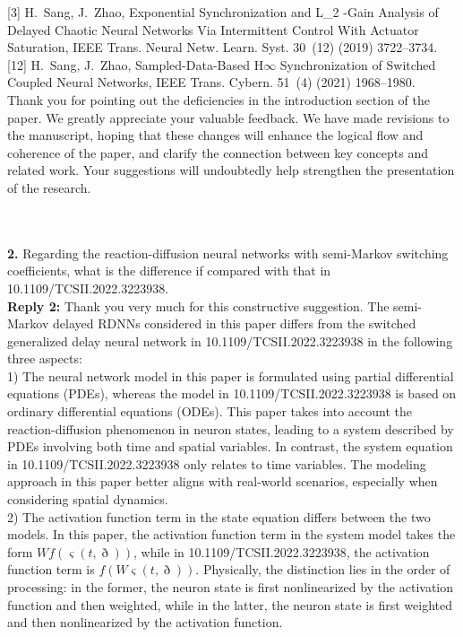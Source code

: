 \documentclass[14pt,fleqn]{article}
\begin{document}
{\color{red} [3] H.~Sang, J.~Zhao, Exponential {{Synchronization}} and {{L}}\_2 -{{Gain
			Analysis}} of {{Delayed Chaotic Neural Networks Via Intermittent Control With
			Actuator Saturation}}, IEEE Trans. Neural Netw. Learn. Syst. 30~(12) (2019)
	3722--3734.}\\
	
{\color{red} [12] H.~Sang, J.~Zhao, Sampled-{{Data-Based H}}{$\infty$} {{Synchronization}} of
	{{Switched Coupled Neural Networks}}, IEEE Trans. Cybern. 51~(4) (2021)
	1968--1980.}\\
	
Thank you for pointing out the deficiencies in the introduction section of the paper. We greatly appreciate your valuable feedback. We have made revisions to the manuscript, hoping that these changes will enhance the logical flow and coherence of the paper, and clarify the connection between key concepts and related work. Your suggestions will undoubtedly help strengthen the presentation of the research.

~\\
\\
\textbf{2.} Regarding the reaction-diffusion neural networks with semi-Markov switching coefficients, what is the difference if compared with that in 10.1109/TCSII.2022.3223938.
\\[10pt]
\indent \textbf{Reply 2:} Thank you very much for this constructive suggestion. The semi-Markov delayed RDNNs considered in this paper differs from the switched generalized delay neural network in 10.1109/TCSII.2022.3223938 in the following three aspects:\\

1) The neural network model in this paper is formulated using partial differential equations (PDEs), whereas the model in 10.1109/TCSII.2022.3223938 is based on ordinary differential equations (ODEs). This paper takes into account the reaction-diffusion phenomenon in neuron states, leading to a system described by PDEs involving both time and spatial variables. In contrast, the system equation in 10.1109/TCSII.2022.3223938 only relates to time variables. The modeling approach in this paper better aligns with real-world scenarios, especially when considering spatial dynamics.\\

2) The activation function term in the state equation differs between the two models. In this paper, the activation function term in the system model takes the form $Wf(\varsigma(t,\eth))$, while in 10.1109/TCSII.2022.3223938, the activation function term is $f(W\varsigma(t,\eth))$. Physically, the distinction lies in the order of processing: in the former, the neuron state is first nonlinearized by the activation function and then weighted, while in the latter, the neuron state is first weighted and then nonlinearized by the activation function. \\
\end{document}
